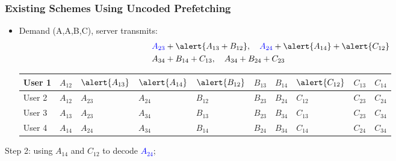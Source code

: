 \documentclass{beamer}
\begin{document}
\begin{frame}
\frametitle{Existing Schemes Using Uncoded Prefetching}
\begin{itemize}
\item Demand (A,A,B,C), server transmits:
\begin{align*}
& \textcolor{blue}{A_{23}} +\alert{A_{13}+B_{12}}, \quad  \textcolor{blue}{A_{24}} +\alert{A_{14}}+\alert{C_{12}} \\
& A_{34} +B_{14}+C_{13} ,\quad  A_{34} +B_{24}+C_{23}
\end{align*}
\begin{table}[]
\centering
\begin{tabular}{|l||l|l|l|l|l|l|l|l|l|}
\hline
User 1 & $A_{12}$ & $\alert{A_{13}}$ & $\alert{A_{14}}$ & $\alert{B_{12}}$ & $B_{13}$ & $B_{14}$ & $\alert{C_{12}}$ & $C_{13}$ & $C_{14}$ \\ \hline
User 2 & $A_{12}$ & $A_{23}$ & $A_{24}$ & $B_{12}$ & $B_{23}$ & $B_{24}$ & $C_{12}$ & $C_{23}$ & $C_{24}$ \\ \hline
User 3 & $A_{13}$ & $A_{23}$ & $A_{34}$ & $B_{13}$ & $B_{23}$ & $B_{34}$ & $C_{13}$ & $C_{23}$ & $C_{34}$ \\ \hline
User 4 & $A_{14}$ & $A_{24}$ & $A_{34}$ & $B_{14}$ & $B_{24}$ & $B_{34}$ & $C_{14}$ & $C_{24}$ & $C_{34}$ \\ \hline
\end{tabular}
\end{table}
\end{itemize}
Step 2: using \alert{$A_{14}$} and \alert{$C_{12}$} to decode \textcolor{blue}{$A_{24}$};
\end{frame}
\end{document}
